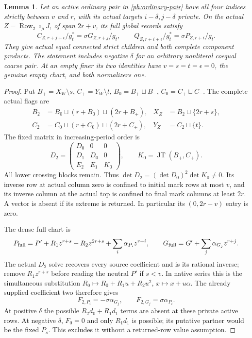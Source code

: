 \documentclass[11pt,a4paper]{amsart}
\numberwithin{equation}{section}
\theoremstyle{plain}
\newtheorem{lemma}[theorem]{Lemma}
\theoremstyle{definition}
\newcommand{\Row}{\operatorname{Row}}
\newcommand{\JT}{\operatorname{JT}}
\begin{document}
\begin{lemma}\label{ph:ordinary-two-copy}
Let an active ordinary pair in \eqref{ph:ordinary-pair} have all four
indices strictly between \(v\) and \(r\), with its actual targets
\(i-\delta,j-\delta\) private.  On the actual
\(Z=\Row_2\circ_\mu J\), of span \(2r+v\), its full global records satisfy
\[
 C_{Z,r+j+\epsilon}/g_t^*=\sigma G_{Z,r+j}/g_t,\qquad
 Q_{Z,r+i+\epsilon}/g_t^*=\sigma P_{Z,r+i}/g_t.
\]
They give actual equal connected strict children and both complete
component products.  The statement includes negative \(\delta\) for
an arbitrary nonliteral coequal coarse pair.  At an empty finer its
two identities have \(v=s=t=\epsilon=0\), the genuine empty chart,
and both normalizers one.
\end{lemma}
\begin{proof}
Put \(B_+=X_W\setminus s\), \(C_+=Y_W\setminus t\),
\(B_0=B_+\sqcup B_-\), \(C_0=C_+\sqcup C_-\).
The complete actual flags are
\[
 \begin{aligned}
 B_2&=B_0\sqcup(r+B_0)\sqcup(2r+B_+),&
 X_Z&=B_2\sqcup\{2r+s\},\\
 C_2&=C_0\sqcup(r+C_0)\sqcup(2r+C_+),&
 Y_Z&=C_2\sqcup\{t\}.
 \end{aligned}
\]
The fixed matrix in increasing-period order is
\[
 D_2=\begin{pmatrix}D_0&0&0\\D_1&D_0&0\\E_2&E_1&K_0\end{pmatrix},
 \qquad K_0=\JT(B_+,C_+).
\]
All lower crossing blocks remain.  Thus
\(\det D_2=(\det D_0)^2\det K_0\ne0\).
Its inverse row at actual column zero is confined to initial mark rows
at most \(v\), and its inverse column at the actual top is confined to
final mark columns at least \(2r\).  A vector is absent if its extreme
is returned.  In particular its \((0,2r+v)\) entry is zero.

The dense full chart is
\[
 P_{\rm full}=P'+R_1z^{r+s}+R_2z^{2r+s}
                 +\sum_i\alpha_{P_i}z^{r+i},\qquad
 G_{\rm full}=G'+\sum_j\alpha_{G_j}z^{r+j}.
\]
The actual \(D_2\) solve recovers every source coefficient and is its
rational inverse; remove \(R_1z^{r+s}\) before reading the neutral
\(P'\) if \(s<v\).
In native series this is the simultaneous substitution
\(R_0\mapsto R_0+R_1u+R_2u^2\), \(x\mapsto x+u\alpha\).
The already supplied coefficient two therefore gives
\[
 F_{2,P_i}=-\sigma\alpha_{G_j},\qquad
 F_{2,G_j}=\sigma\alpha_{P_i}.
\]
At positive \(\delta\) the possible \(R_2d_0+R_1d_1\) terms are absent
at these private active rows.  At negative \(\delta\), \(F_0=0\)
and only \(R_1d_1\) is possible; its putative partner would be the fixed
\(P_s\).  This excludes it without a returned-row value assumption.


\end{proof}
\end{document}
